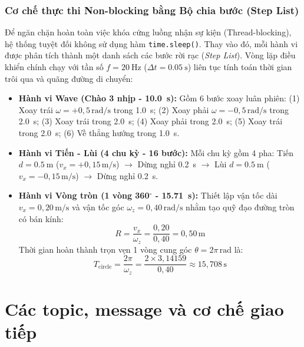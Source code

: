 \subsubsection{Cơ chế thực thi Non-blocking bằng Bộ chia bước (Step List)}
Để ngăn chặn hoàn toàn việc khóa cứng luồng nhận sự kiện (Thread-blocking), hệ thống tuyệt đối không sử dụng hàm \texttt{time.sleep()}. Thay vào đó, mỗi hành vi được phân tích thành một danh sách các bước rời rạc (\textit{Step List}). Vòng lặp điều khiển chính chạy với tần số $f = \SI{20}{\hertz}$ ($\Delta t = \SI{0.05}{\second}$) liên tục tính toán thời gian trôi qua và quãng đường di chuyển:
\begin{itemize}
    \item \textbf{Hành vi Wave (Chào 3 nhịp - \SI{10.0}{\second}):} Gồm 6 bước xoay luân phiên: (1) Xoay trái $\omega = +0{,}5\,\text{rad/s}$ trong \SI{1.0}{\second}; (2) Xoay phải $\omega = -0{,}5\,\text{rad/s}$ trong \SI{2.0}{\second}; (3) Xoay trái trong \SI{2.0}{\second}; (4) Xoay phải trong \SI{2.0}{\second}; (5) Xoay trái trong \SI{2.0}{\second}; (6) Về thẳng hướng trong \SI{1.0}{\second}.
    \item \textbf{Hành vi Tiến - Lùi (4 chu kỳ - 16 bước):} Mỗi chu kỳ gồm 4 pha: Tiến $d = \SI{0.5}{\meter}$ ($v_x = +0{,}15\,\text{m/s}$) $\to$ Dừng nghỉ \SI{0.2}{\second} $\to$ Lùi $d = \SI{0.5}{\meter}$ ($v_x = -0{,}15\,\text{m/s}$) $\to$ Dừng nghỉ \SI{0.2}{\second}.
    \item \textbf{Hành vi Vòng tròn (1 vòng 360$^\circ$ - \SI{15.71}{\second}):} Thiết lập vận tốc dài $v_x = 0{,}20\,\text{m/s}$ và vận tốc góc $\omega_z = 0{,}40\,\text{rad/s}$ nhằm tạo quỹ đạo đường tròn có bán kính:
    \begin{equation}
        R = \frac{v_x}{\omega_z} = \frac{0{,}20}{0{,}40} = 0{,}50\,\text{m}
    \end{equation}
    Thời gian hoàn thành trọn vẹn 1 vòng cung góc $\theta = 2\pi\,\text{rad}$ là:
    \begin{equation}
        T_{\text{circle}} = \frac{2\pi}{\omega_z} = \frac{2\times 3{,}14159}{0{,}40} \approx 15{,}708\,\text{s}
    \end{equation}
\end{itemize}

\section{Các topic, message và cơ chế giao tiếp}

